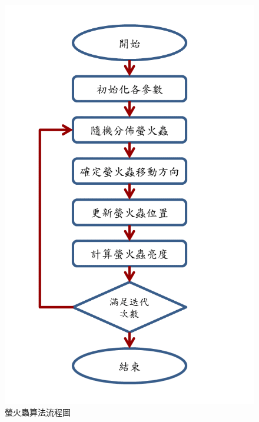 \documentclass[14pt,a4paper]{report}  %
\begin{document}
{        \begin{figure}[hbt!]
        \centering
        \includegraphics[scale=0.3]{螢火蟲算法.png} 
        \caption{螢火蟲算法流程圖}
        \label{fig:scale}
        \end{figure}
        
}
\end{document}
